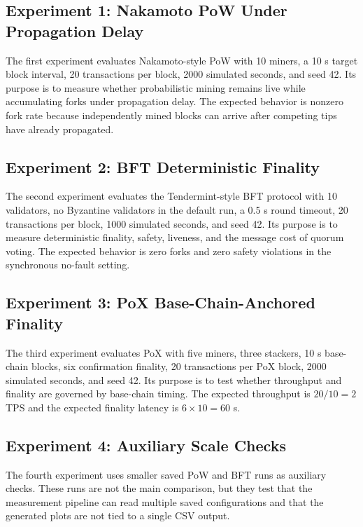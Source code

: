 \documentclass[11pt]{article}
\begin{document}
\subsection{Experiment 1: Nakamoto PoW Under Propagation Delay}

The first experiment evaluates Nakamoto-style PoW with 10 miners, a 10 s target block interval, 20 transactions per block, 2000 simulated seconds, and seed 42. Its purpose is to measure whether probabilistic mining remains live while accumulating forks under propagation delay. The expected behavior is nonzero fork rate because independently mined blocks can arrive after competing tips have already propagated.

\subsection{Experiment 2: BFT Deterministic Finality}

The second experiment evaluates the Tendermint-style BFT protocol with 10 validators, no Byzantine validators in the default run, a 0.5 s round timeout, 20 transactions per block, 1000 simulated seconds, and seed 42. Its purpose is to measure deterministic finality, safety, liveness, and the message cost of quorum voting. The expected behavior is zero forks and zero safety violations in the synchronous no-fault setting.

\subsection{Experiment 3: PoX Base-Chain-Anchored Finality}

The third experiment evaluates PoX with five miners, three stackers, 10 s base-chain blocks, six confirmation finality, 20 transactions per PoX block, 2000 simulated seconds, and seed 42. Its purpose is to test whether throughput and finality are governed by base-chain timing. The expected throughput is $20/10=2$ TPS and the expected finality latency is $6 \times 10=60$ s.

\subsection{Experiment 4: Auxiliary Scale Checks}

The fourth experiment uses smaller saved PoW and BFT runs as auxiliary checks. These runs are not the main comparison, but they test that the measurement pipeline can read multiple saved configurations and that the generated plots are not tied to a single CSV output.
\end{document}

